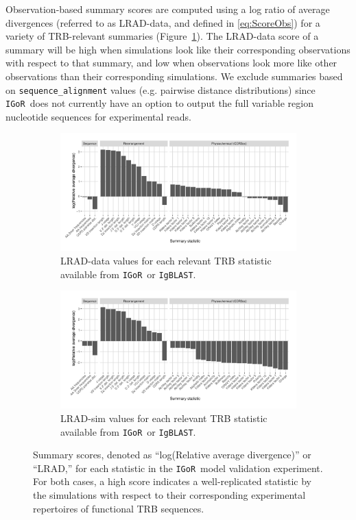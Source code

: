 \documentclass{article}
\newcommand{\igor}{\texttt{IGoR}}
\newcommand{\igblast}{\texttt{IgBLAST}}
\begin{document}
Observation-based summary scores are computed using a log ratio of average divergences (referred to as LRAD-data, and defined in \eqref{eq:ScoreObs}) for a variety of TRB-relevant summaries (Figure~\ref{fig:ObsScoresTCR}). 
The LRAD-data score of a summary will be high when simulations look like their corresponding observations with respect to that summary, and low when observations look more like other observations than their corresponding simulations.
We exclude summaries based on \texttt{sequence\_alignment} values (e.g. pairwise distance distributions) since \igor\ does not currently have an option to output the full variable region nucleotide sequences for experimental reads.
\begin{figure}
	\begin{subfigure}{\textwidth}
    	\includegraphics[width=\linewidth]{Figures/IgorScores/obs_score_plot.pdf}
    	\caption{LRAD-data values for each relevant TRB statistic available from \igor\ or \igblast.
        }
    	\label{fig:ObsScoresTCR}
	\end{subfigure}
	\begin{subfigure}{\textwidth}
    	\includegraphics[width=\linewidth]{Figures/IgorScores/sim_score_plot.pdf}
    	\caption{LRAD-sim values for each relevant TRB statistic available from \igor\ or \igblast.
    	}
    	\label{fig:SimScoresTCR}
	\end{subfigure}
	\caption{Summary scores, denoted as ``log(Relative average divergence)'' or ``LRAD,'' for each statistic in the \igor\ model validation experiment. For both cases, a high score indicates a well-replicated statistic by the simulations with respect to their corresponding experimental repertoires of functional TRB sequences.}
	\label{fig:TCRScores}
\end{figure}
\end{document}
